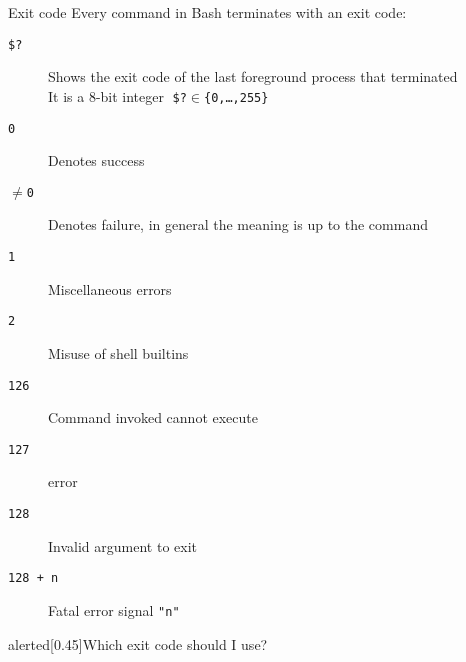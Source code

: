 
\begin{frame}{Exit code}
    \vspace{-3mm}
    Every command in Bash terminates with an exit code:
    \begin{description}
        \item[\texttt{\$?}]
            Shows the exit code of the last foreground process that terminated\\
            It is a 8-bit integer $\;$\texttt{\$?}${}\in{}$\texttt{\{0,\dots,255\}} \hfill{}
        \item[\texttt{0}] Denotes success
        \item[$\neq$\texttt{0}] Denotes failure, in general the meaning is up to the command
        \item[\texttt{1}] Miscellaneous errors
        \item[\texttt{2}] Misuse of shell builtins
        \item[\texttt{126}] Command invoked cannot execute
        \item[\texttt{127}]  error
        \item[\texttt{128}] Invalid argument to exit
        \item[\texttt{128 + n}] Fatal error signal \texttt{"n"} 
    \end{description}
    \begin{varblock}{alerted}[0.45\textwidth]{Which exit code should I use?}
    \end{varblock}
\end{frame}
